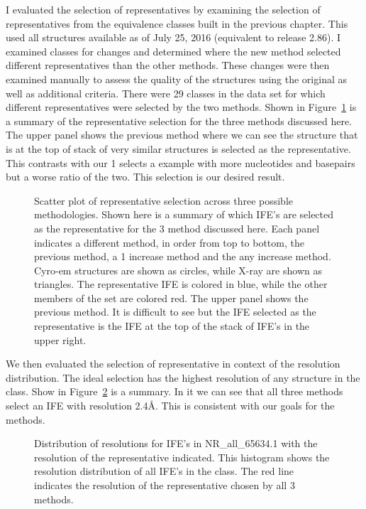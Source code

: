 I evaluated the selection of representatives by examining the selection of
representatives from the equivalence classes built in the previous chapter. This
used all structures available as of July 25, 2016 (equivalent to release 2.86).
I examined classes for changes and determined where the new method selected
different representatives than the other methods. These changes were then
examined manually to assess the quality of the structures using the original as
well as additional criteria. There were 29 classes in the data set for which
different representatives were selected by the two methods. Shown in
Figure~\ref{fig:hm-lsu-rep} is a summary of the representative selection for the
three methods discussed here. The upper panel shows the previous method where we
can see the structure that is at the top of stack of very similar structures is
selected as the representative. This contrasts with our 1%
selects a example with more nucleotides and basepairs but a worse ratio of the
two. This selection is our desired result.

\begin{figure}
  \caption{Scatter plot of representative selection across three possible
    methodologies. Shown here is a summary of which IFE’s are selected as the
    representative for the 3 method discussed here. Each panel indicates a
    different method, in order from top to bottom, the previous method, a 1%
    increase method and the any increase method. Cyro-em structures are shown as
    circles, while X-ray are shown as triangles.  The representative IFE is
    colored in blue, while the other members of the set are colored red. The
    upper panel shows the previous method. It is difficult to see but the IFE
    selected as the representative is the IFE at the top of the stack of IFE’s
  in the upper right.}
  \label{fig:hm-lsu-rep}
\end{figure}

We then evaluated the selection of representative in context of the resolution
distribution. The ideal selection has the highest resolution of any structure in
the class. Show in Figure~\ref{fig:hm-rep-res-dist} is a summary. In it we can
see that all three methods select an IFE with resolution 2.4{\AA}. This is
consistent with our goals for the methods.

\begin{figure}
  \caption{Distribution of resolutions for IFE’s in NR\_all\_65634.1 with the
    resolution of the representative indicated. This histogram shows the
    resolution distribution of all IFE’s in the class. The red line indicates
  the resolution of the representative chosen by all 3 methods.}
  \label{fig:hm-rep-res-dist}
\end{figure}

